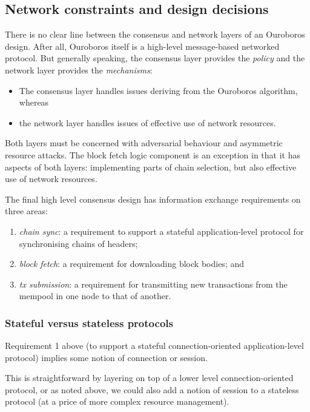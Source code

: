 \documentclass[11pt,a4paper]{article}
\begin{document}
\subsection{Network constraints and design decisions}
\label{network-constraints-and-design-decisions}

There is no clear line between the consensus and network layers of an
Ouroboros design. After all, Ouroboros itself is a high-level
message-based networked protocol. But generally speaking, the consensus
layer provides the \emph{policy} and the network layer provides the
\emph{mechanisms}:

\begin{itemize}
\item
  The consensus layer handles issues deriving from the Ouroboros
  algorithm, whereas
\item
  the network layer handles issues of effective use of network
  resources.
\end{itemize}

Both layers must be concerned with adversarial behaviour and asymmetric
resource attacks. The block fetch logic component is an exception in
that it has aspects of both layers: implementing parts of chain
selection, but also effective use of network resources.

The final high level consensus design has information exchange
requirements on three areas:

\begin{enumerate}
\item
  \emph{chain sync}: a requirement to support a stateful
  application-level protocol for synchronising chains of headers;
\item
  \emph{block fetch}: a requirement for downloading block
  bodies; and
\item
  \emph{tx submission}: a requirement for transmitting new
  transactions from the mempool in one node to that of another.
\end{enumerate}

\subsubsection{Stateful versus stateless protocols}
\label{stateful-versus-stateless-protocols}

Requirement 1 above (to support a stateful connection-oriented
application-level protocol) implies some notion of connection or
session.

This is straightforward by layering on top of a lower level
connection-oriented protocol, or as noted above, we could also add a
notion of session to a stateless protocol (at a price of more complex
resource management).
\end{document}
